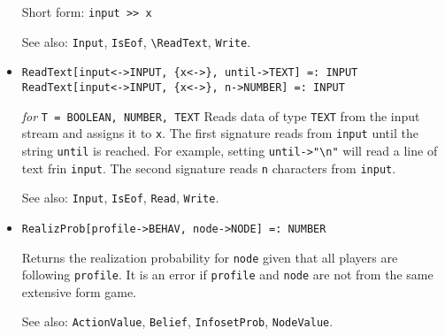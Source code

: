 \begin{itemize}
{\it for} {\tt T = BOOLEAN, NUMBER, TEXT}
\bd
Reads data of type \verb+T+ from the input stream and assigns it to
\verb+x+.  If \verb+x+ is undefined, then its data type is determined
from the exposed data in the input stream.  If \verb+x+ is previously
defined, then the \verb+Read+ function will expect to find the
corresponding data type in the input stream, and a file read error
will be generated if the exposed data is of the wrong data type.  If
\verb+x+ is previously defined to be a \verb+LIST+, then \verb+Read[in,x]+
will successively read elements into each element of the list.  If the
wrong data type is found for any element of the list, a file read
error will be returned.

The ``exposed data'' in the input stream consists of the following: If
first character is a double quote (\verb+"+), then the exposed data
consists of all characters up until the next double quote.  If the
first character is a \verb+{+, then the exposed data consists of all
the characters up until the next matching \verb+}+.  Otherwise, the
exposed data consists of all characters until the next whitespace.
\item [Short form:] \verb+input >> x+
\item [See also:] \verb+Input+, \verb+IsEof+, \verb+\ReadText+, 
\verb+Write+.
\ed

\item{}
\protect \large \begin{verbatim}
ReadText[input<->INPUT, {x<->}, until->TEXT] =: INPUT
ReadText[input<->INPUT, {x<->}, n->NUMBER] =: INPUT
\end{verbatim}\normalsize

{\it for} {\tt T = BOOLEAN, NUMBER, TEXT} 
\bd 
Reads data of type \verb+TEXT+ from the input stream and assigns it to
\verb+x+.  The first signature reads from \verb+input+ until the
string \verb+until+ is reached.  For example, setting
\verb+until->"\n"+ will read a line of text frin \verb+input+.  The
second signature reads \verb+n+ characters from \verb+input+.  
\item [See also:] \verb+Input+, \verb+IsEof+, \verb+Read+, \verb+Write+.
\ed

\item{}
\protect \large \begin{verbatim}
RealizProb[profile->BEHAV, node->NODE] =: NUMBER 
\end{verbatim}\normalsize

\bd
Returns the realization probability for \verb+node+ given that all players
are following \verb+profile+.  It is an error if \verb+profile+ and
\verb+node+ are not from the same extensive form game.
\item [See also:] \verb+ActionValue+, \verb+Belief+, \verb+InfosetProb+,
\verb+NodeValue+.
\ed


\end{itemize}
